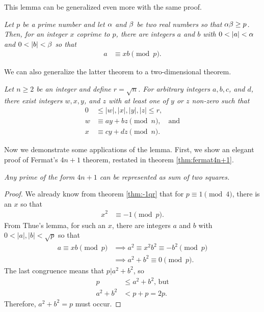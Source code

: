 \documentclass{subfile}
\begin{document}
	This lemma can be generalized even more with the same proof.
	\begin{theorem}\slshape
		Let $p$ be a prime number and let $\alpha$ and $\beta $ be two real numbers so that $\alpha\beta \geq p$. Then, for an integer $x$ coprime to $p$, there are integers $a$ and $b$ with $0<|a|<\a$ and $0<|b|<\b $ so that
		\begin{align*}
			a & \equiv xb\pmod p.
		\end{align*} 
	\end{theorem}
	We can also generalize the latter theorem to a two-dimensional theorem.
	\begin{theorem}\slshape
		Let $n\geq2$ be an integer and define $r=\sqrt{n}$. For arbitrary integers $a,b,c$, and $d$, there exist integers $w,x,y$, and $z$ with at least one of $y$ or $z$ non-zero such that
		\begin{align*}
			0& \leq |w|,|x|,|y|,|z|\leq r,\\
			w&\equiv ay+bz\pmod n, \quad \text{and}\\
			x&\equiv cy+dz\pmod n.
		\end{align*}
	\end{theorem}
	
	
	Now we demonstrate some applications of the lemma. First, we show an elegant proof of Fermat's $4n+1$ theorem, restated in theorem \eqref{thm:fermat4n+1}.
	
	\begin{theorem}\slshape\label{thm:fermat4n+1}
		Any prime of the form $4n+1$ can be represented as sum of two squares.
	\end{theorem}

	\begin{proof}
		We already know from theorem \eqref{thm:-1qr} that for $p\equiv1\pmod4$, there is an $x$ so that
		\begin{align*}
			x^2 & \equiv-1\pmod p.
		\end{align*}
		From Thue's lemma, for such an $x$, there are integers $a$ and $b$ with $0<|a|,|b|<\sqrt{p}$ so that
		\begin{align*}
			a \equiv xb \pmod p & \implies	a^2 \equiv x^2b^2 \equiv -b^2\pmod p\\
			& \implies	a^2+b^2 \equiv 0 \pmod p.
		\end{align*}
		The last congruence means that $p|a^2+b^2$, so
		\begin{align*}
			p   &\leq a^2+b^2\text {, but}\\
			a^2+b^2	&< p+p = 2p.
		\end{align*}
		Therefore, $a^2+b^2=p$ must occur.
	\end{proof}
\end{document}
